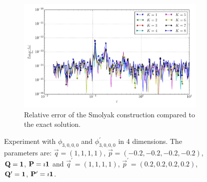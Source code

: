 \documentclass[a4paper,10pt]{article}
\begin{document}
\begin{figure}[ht!]
\begin{subfigure}[t]{0.5\linewidth}
    \includegraphics[width=\linewidth]{./plots/tp_sg_4d_conv_eps_(3,0,0,0)_(3,0,0,0)_err_rel_nsd_gk.pdf}
    \caption{Relative error of the Smolyak construction compared to the exact solution.}
    \label{fig:tp_sg_4d_conv_eps_3000_3000_err_rel_nsd_gk}
  \end{subfigure}
  \label{fig:tp_sg_4d_conv_eps_3000_3000}
  \caption{Experiment with $\phi_{3,0,0,0}$ and $\phi_{3,0,0,0}^{\prime}$
  in 4 dimensions.
  The parameters are:
  $\vec{q} = (1, 1, 1, 1)$,
  $\vec{p} = (-0.2, -0.2, -0.2, -0.2)$,
  $\mathbf{Q} = \mathbf{1}$,
  $\mathbf{P} = \imath \mathbf{1}$
  and
  $\vec{q}^\prime = (1, 1, 1, 1)$,
  $\vec{p}^\prime = (0.2, 0.2, 0.2, 0.2)$,
  $\mathbf{Q}^\prime = \mathbf{1}$,
  $\mathbf{P}^\prime = \imath \mathbf{1}$.}
\end{figure}
\end{document}
